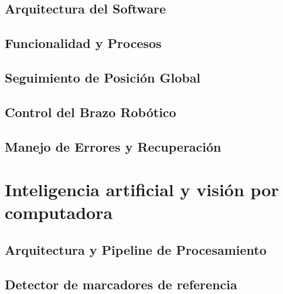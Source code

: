 \documentclass[a4paper,12pt]{report}
\begin{document}
\subsection{Arquitectura del Software}


\subsection{Funcionalidad y Procesos}


\subsection{Seguimiento de Posición Global}


\subsection{Control del Brazo Robótico}


\subsection{Manejo de Errores y Recuperación}


\section{Inteligencia artificial y visión por computadora}

\subsection{Arquitectura y Pipeline de Procesamiento}



\subsection{Detector de marcadores de referencia}




\end{document}
